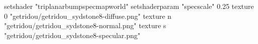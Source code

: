 setshader "triplanarbumpspecmapworld"
setshaderparam "specscale" 0.25
texture 0 "getridou/getridou_sydstone8-diffuse.png"
texture n "getridou/getridou_sydstone8-normal.png"
texture s "getridou/getridou_sydstone8-specular.png"
